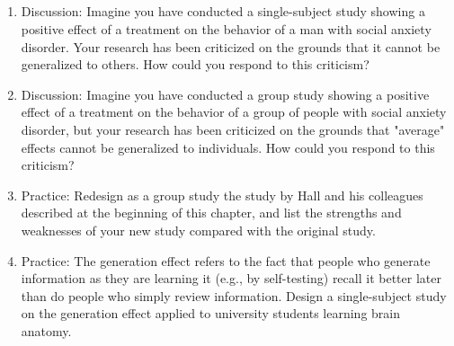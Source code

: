  

 
\subsection{}

 
\begin{fullwidth}

 
\begin{enumerate}

 
\item Discussion: Imagine you have conducted a single-subject study showing a positive effect of a treatment on the behavior of a man with social anxiety disorder. Your research has been criticized on the grounds that it cannot be generalized to others. How could you respond to this criticism?

 

\item Discussion: Imagine you have conducted a group study showing a positive effect of a treatment on the behavior of a group of people with social anxiety disorder, but your research has been criticized on the grounds that "average" effects cannot be generalized to individuals. How could you respond to this criticism?

 

\item  Practice: Redesign as a group study the study by Hall and his colleagues described at the beginning of this chapter, and list the strengths and weaknesses of your new study compared with the original study.

 

\item Practice: The generation effect refers to the fact that people who generate information as they are learning it (e.g., by self-testing) recall it better later than do people who simply review information. Design a single-subject study on the generation effect applied to university students learning brain anatomy.

 
\end{enumerate}

 
\end{fullwidth}  
